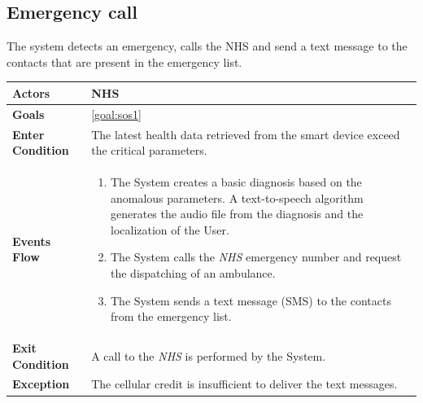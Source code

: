   \subsection{Emergency call}
The system detects an emergency, calls the NHS and send a text message to the contacts that are present in the emergency list.

\begin{table}[H]
	\centering
    
    \begin{tabular}{|p{3.5cm}|p{10.3cm}|}
    
    \hline
    \textbf{\large{Actors}}  			& NHS						     \\
    				 					
    \hline
    \textbf{\large{Goals}} 				& \ref{goal:sos1}                \\
    
    \hline
    \textbf{\large{Enter Condition}}	& The latest health data retrieved from the smart device exceed the critical parameters.		\\
    
    \hline
    \textbf{\large{Events Flow}}		& \begin{enumerate}[leftmargin=0.5cm]
                                          	\item The System creates a basic diagnosis based on the anomalous parameters. A text-to-speech algorithm generates the audio file from the diagnosis and the localization of the User.
                                            \item The System calls the \emph{NHS} emergency number and request the dispatching of an ambulance.
                                            \item The System sends a text message (SMS) to the contacts from the emergency list.
                                      \end{enumerate}
    										\\
    \hline
    \textbf{\large{Exit Condition}} 	& A call to the \emph{NHS} is performed by the System. \\
    
    \hline
    \textbf{\large{Exception}} 			& The cellular credit is insufficient to deliver the text messages.\\
    								
    \hline
    
    \end{tabular}
	
\end{table}
